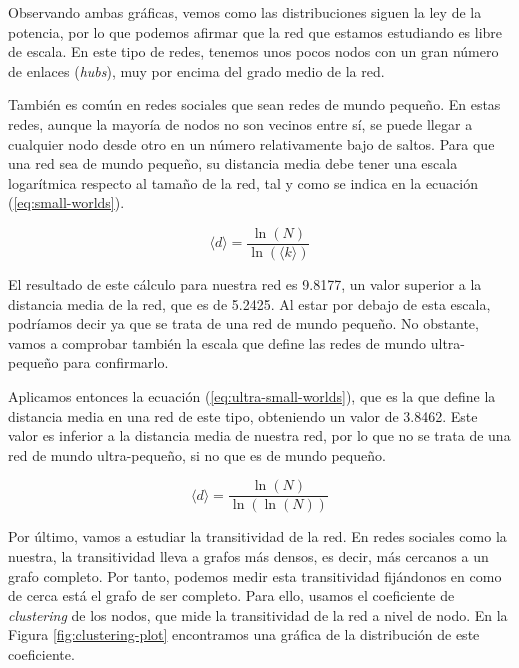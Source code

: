 Observando ambas gráficas, vemos como las distribuciones siguen la ley de la
potencia, por lo que podemos afirmar que la red que estamos estudiando es libre
de escala. En este tipo de redes, tenemos unos pocos nodos con un gran número de
enlaces (\textit{hubs}), muy por encima del grado medio de la red.

También es común en redes sociales que sean redes de mundo pequeño. En estas
redes, aunque la mayoría de nodos no son vecinos entre sí, se puede llegar a
cualquier nodo desde otro en un número relativamente bajo de saltos. Para que
una red sea de mundo pequeño, su distancia media debe tener una escala
logarítmica respecto al tamaño de la red, tal y como se indica en la ecuación
(\ref{eq:small-worlds}).

\begin{equation}
    \langle d \rangle = \frac{\ln(N)}{\ln(\langle k \rangle)}
    \label{eq:small-worlds}
\end{equation}

El resultado de este cálculo para nuestra red es 9.8177, un valor superior a la
distancia media de la red, que es de 5.2425. Al estar por debajo de esta escala,
podríamos decir ya que se trata de una red de mundo pequeño. No obstante, vamos
a comprobar también la escala que define las redes de mundo ultra-pequeño para
confirmarlo.

Aplicamos entonces la ecuación (\ref{eq:ultra-small-worlds}), que es la que
define la distancia media en una red de este tipo, obteniendo un valor de
3.8462. Este valor es inferior a la distancia media de nuestra red, por lo que
no se trata de una red de mundo ultra-pequeño, si no que es de mundo pequeño.

\begin{equation}
    \langle d \rangle = \frac{\ln(N)}{\ln(\ln(N))}
    \label{eq:ultra-small-worlds}
\end{equation}

Por último, vamos a estudiar la transitividad de la red. En redes sociales como
la nuestra, la transitividad lleva a grafos más densos, es decir, más cercanos a
un grafo completo. Por tanto, podemos medir esta transitividad fijándonos en
como de cerca está el grafo de ser completo. Para ello, usamos el coeficiente de
\textit{clustering} de los nodos, que mide la transitividad de la red a nivel de
nodo. En la Figura \ref{fig:clustering-plot} encontramos una gráfica de la
distribución de este coeficiente.

